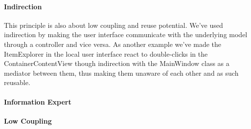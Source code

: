 \paragraph{Indirection}
This principle is also about low coupling and reuse potential. We've used indirection by making the user interface communicate with the underlying model through a controller and vice versa. As another example we've made the ItemExplorer in the local user interface react to double-clicks in the ContainerContentView though indirection with the MainWindow class as a mediator between them, thus making them unaware of each other and as such reusable.

\paragraph{Information Expert}

\paragraph{Low Coupling}
